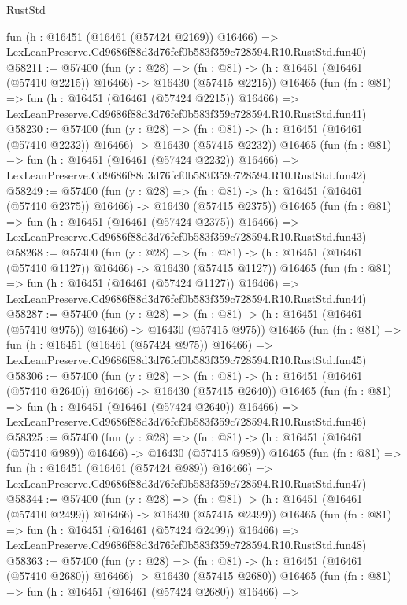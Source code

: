 \begin{lexlean}{RustStd}
\begin{coremodule}
    fun (h : @16451 (@16461 (@57424 @2169)) @16466) =>
    LexLeanPreserve.Cd9686f88d3d76fcf0b583f359c728594.R10.RustStd.fun40)
@58211 := @57400
    (fun (y : @28) =>
    (fn : @81) -> (h : @16451 (@16461 (@57410 @2215)) @16466) -> @16430 (@57415 @2215))
    @16465
    (fun (fn : @81) =>
    fun (h : @16451 (@16461 (@57424 @2215)) @16466) =>
    LexLeanPreserve.Cd9686f88d3d76fcf0b583f359c728594.R10.RustStd.fun41)
@58230 := @57400
    (fun (y : @28) =>
    (fn : @81) -> (h : @16451 (@16461 (@57410 @2232)) @16466) -> @16430 (@57415 @2232))
    @16465
    (fun (fn : @81) =>
    fun (h : @16451 (@16461 (@57424 @2232)) @16466) =>
    LexLeanPreserve.Cd9686f88d3d76fcf0b583f359c728594.R10.RustStd.fun42)
@58249 := @57400
    (fun (y : @28) =>
    (fn : @81) -> (h : @16451 (@16461 (@57410 @2375)) @16466) -> @16430 (@57415 @2375))
    @16465
    (fun (fn : @81) =>
    fun (h : @16451 (@16461 (@57424 @2375)) @16466) =>
    LexLeanPreserve.Cd9686f88d3d76fcf0b583f359c728594.R10.RustStd.fun43)
@58268 := @57400
    (fun (y : @28) =>
    (fn : @81) -> (h : @16451 (@16461 (@57410 @1127)) @16466) -> @16430 (@57415 @1127))
    @16465
    (fun (fn : @81) =>
    fun (h : @16451 (@16461 (@57424 @1127)) @16466) =>
    LexLeanPreserve.Cd9686f88d3d76fcf0b583f359c728594.R10.RustStd.fun44)
@58287 := @57400
    (fun (y : @28) =>
    (fn : @81) -> (h : @16451 (@16461 (@57410 @975)) @16466) -> @16430 (@57415 @975))
    @16465
    (fun (fn : @81) =>
    fun (h : @16451 (@16461 (@57424 @975)) @16466) =>
    LexLeanPreserve.Cd9686f88d3d76fcf0b583f359c728594.R10.RustStd.fun45)
@58306 := @57400
    (fun (y : @28) =>
    (fn : @81) -> (h : @16451 (@16461 (@57410 @2640)) @16466) -> @16430 (@57415 @2640))
    @16465
    (fun (fn : @81) =>
    fun (h : @16451 (@16461 (@57424 @2640)) @16466) =>
    LexLeanPreserve.Cd9686f88d3d76fcf0b583f359c728594.R10.RustStd.fun46)
@58325 := @57400
    (fun (y : @28) =>
    (fn : @81) -> (h : @16451 (@16461 (@57410 @989)) @16466) -> @16430 (@57415 @989))
    @16465
    (fun (fn : @81) =>
    fun (h : @16451 (@16461 (@57424 @989)) @16466) =>
    LexLeanPreserve.Cd9686f88d3d76fcf0b583f359c728594.R10.RustStd.fun47)
@58344 := @57400
    (fun (y : @28) =>
    (fn : @81) -> (h : @16451 (@16461 (@57410 @2499)) @16466) -> @16430 (@57415 @2499))
    @16465
    (fun (fn : @81) =>
    fun (h : @16451 (@16461 (@57424 @2499)) @16466) =>
    LexLeanPreserve.Cd9686f88d3d76fcf0b583f359c728594.R10.RustStd.fun48)
@58363 := @57400
    (fun (y : @28) =>
    (fn : @81) -> (h : @16451 (@16461 (@57410 @2680)) @16466) -> @16430 (@57415 @2680))
    @16465
    (fun (fn : @81) =>
    fun (h : @16451 (@16461 (@57424 @2680)) @16466) =>

\end{coremodule}
\end{lexlean}
